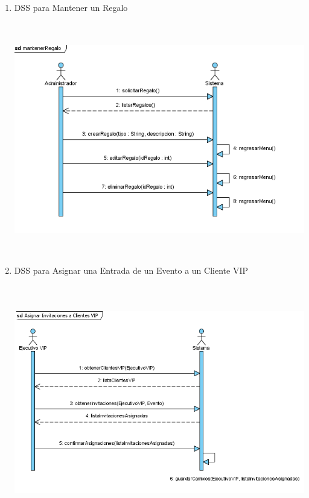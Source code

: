 
\begin{enumerate}
	\item DSS para Mantener un Regalo\\\\
		\includegraphics[height=10cm]{images/dss_mantenerRegalo.png}
	\item DSS para Asignar una Entrada de un Evento a un Cliente VIP\\\\
		\includegraphics[height=10cm]{images/dss_invitacionesClienteVIP.png}

\end{enumerate}
